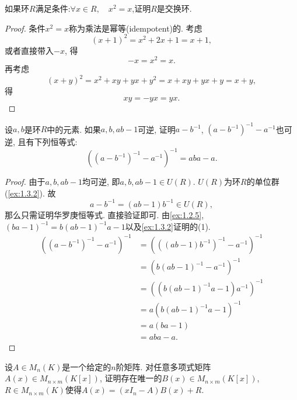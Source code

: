 \begin{problem}\label{ex:1.2.6}
    如果环$R$满足条件:$\forall x \in R,\quad x^2 = x$,证明$R$是交换环.
\end{problem}

\begin{proof}
    条件$x^2 = x$称为乘法是幂等(idempotent)的. 考虑
    \[
        (x + 1)^2 = x^2 + 2x + 1 = x + 1,
    \]
    或者直接带入$-x$, 得
    \[
        -x = x^2 = x.
    \]
    再考虑
    \[
        (x + y)^2 = x^2 + xy + yx + y^2 = x + xy + yx + y = x + y,
    \]
    得
    \[
        xy = -yx = yx.
    \]
\end{proof}

\begin{problem}[华罗庚恒等式]
    设$a, b$是环$R$中的元素. 如果$a, b, ab - 1$可逆, 证明$a - b^{-1}$, $(a - b^{-1})^{-1} - a^{-1}$也可逆, 且有下列恒等式:
    \[
        \left((a - b^{-1})^{-1} - a^{-1}\right)^{-1} = aba - a.
    \]
\end{problem}

\begin{proof}
    由于$a, b, ab - 1$均可逆, 即$a, b, ab - 1 \in U(R)$. $U(R)$为环$R$的单位群(\ref{ex:1.3.2}). 故
    \[
        a - b^{-1} = (ab - 1)b^{-1} \in U(R),
    \]
    那么只需证明华罗庚恒等式. 直接验证即可. 由\ref{ex:1.2.5}, $(ba - 1)^{-1} = b(ab - 1)^{-1}a - 1$以及\ref{ex:1.3.2}证明的(1).
    \[
    \begin{aligned}
        \left((a - b^{-1})^{-1} - a^{-1}\right)^{-1} &= \left(((ab - 1)b^{-1})^{-1} - a^{-1}\right)^{-1}\\
        &= (b(ab - 1)^{-1} - a^{-1})^{-1}\\
        &= \left((b(ab - 1)^{-1}a - 1)a^{-1}\right)^{-1}\\
        &= a(b(ab - 1)^{-1}a - 1)^{-1}\\
        &= a(ba - 1)\\
        &= aba - a.
    \end{aligned}
    \]
\end{proof}

\begin{problem}[多项式矩阵的带余除法]\label{ex:1.2.8}
    设$A \in M_n(K)$是一个给定的$n$阶矩阵. 对任意多项式矩阵$A(x) \in M_{n \times m}(K[x])$, 证明存在唯一的$B(x) \in M_{n \times m}(K[x])$, $R \in M_{n \times m}(K)$使得$A(x) = (xI_n - A)B(x) + R$.
\end{problem}

